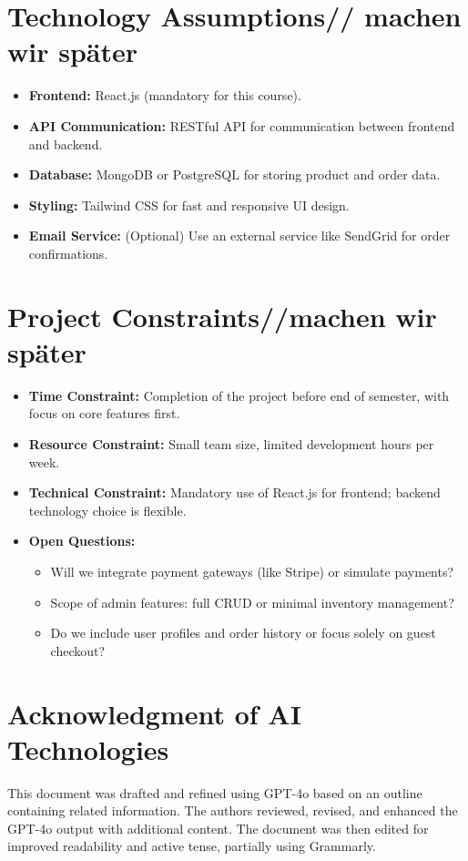\documentclass[a4paper,12pt]{article}
\begin{document}
	
	\section{Technology Assumptions// machen wir später}
	\begin{itemize}
		\item \textbf{Frontend:} React.js (mandatory for this course).
	
		\item \textbf{API Communication:} RESTful API for communication between frontend and backend.
		\item \textbf{Database:} MongoDB or PostgreSQL for storing product and order data.
		\item \textbf{Styling:} Tailwind CSS for fast and responsive UI design.
		\item \textbf{Email Service:} (Optional) Use an external service like SendGrid for order confirmations.
	\end{itemize}
	
	\section{Project Constraints//machen wir später }
	\begin{itemize}
		\item \textbf{Time Constraint:} Completion of the project before end of semester, with focus on core features first.
		\item \textbf{Resource Constraint:} Small team size, limited development hours per week.
		\item \textbf{Technical Constraint:} Mandatory use of React.js for frontend; backend technology choice is flexible.
		\item \textbf{Open Questions:}
		\begin{itemize}
			\item Will we integrate payment gateways (like Stripe) or simulate payments?
			\item Scope of admin features: full CRUD or minimal inventory management?
			\item Do we include user profiles and order history or focus solely on guest checkout?
		\end{itemize}
	\end{itemize}
	
	\section{Acknowledgment of AI Technologies}
	This document was drafted and refined using GPT-4o based on an outline containing related information. The authors reviewed, revised, and enhanced the GPT-4o output with additional content. The document was then edited for improved readability and active tense, partially using Grammarly.
	
\end{document}
